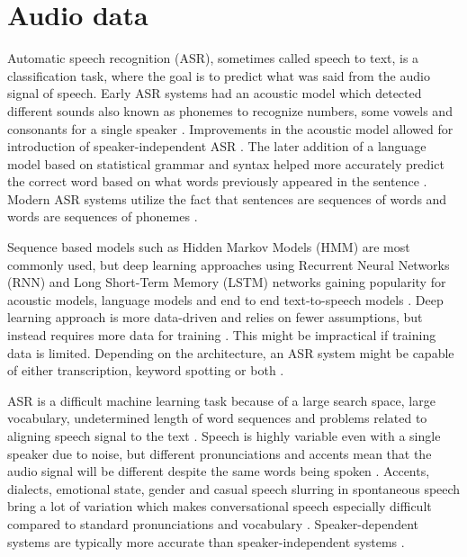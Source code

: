 \documentclass[utf8,english]{gradu3}
\begin{document}
\section{Audio data}
Automatic speech recognition (ASR), sometimes called speech to text, is a classification task, where the goal is to predict what was said from the audio signal of speech. Early ASR systems had an acoustic model which detected different sounds also known as phonemes to recognize numbers, some vowels and consonants for a single speaker \parencite{juangAutomaticSpeechRecognition2005}. Improvements in the acoustic model allowed for introduction of speaker-independent ASR \parencite{benzeghibaAutomaticSpeechRecognition2007,juangAutomaticSpeechRecognition2005}. The later addition of a language model based on statistical grammar and syntax helped more accurately predict the correct word based on what words previously appeared in the sentence \parencite{juangAutomaticSpeechRecognition2005}. Modern ASR systems utilize the fact that sentences are sequences of words and words are sequences of phonemes \parencite{bengioWordEmbeddingsSpeech2014}. 

Sequence based models such as Hidden Markov Models (HMM) are most commonly used, but deep learning approaches using Recurrent Neural Networks (RNN) and Long Short-Term Memory (LSTM) networks gaining popularity for acoustic models, language models and end to end text-to-speech models \parencite{bengioWordEmbeddingsSpeech2014,enarviAutomaticSpeechRecognition2017}. Deep learning approach is more data-driven and relies on fewer assumptions, but instead requires more data for training \parencite{bengioWordEmbeddingsSpeech2014}. This might be impractical if training data is limited. Depending on the architecture, an ASR system might be capable of either transcription, keyword spotting or both \parencite{juangAutomaticSpeechRecognition2005,enarviAutomaticSpeechRecognition2017}.

ASR is a difficult machine learning task because of a large search space, large vocabulary, undetermined length of word sequences and problems related to aligning speech signal to the text \parencite{enarviAutomaticSpeechRecognition2017}. Speech is highly variable even with a single speaker due to noise, but different pronunciations and accents mean that the audio signal will be different despite the same words being spoken \parencite{juangAutomaticSpeechRecognition2005}. Accents, dialects, emotional state, gender and casual speech slurring in spontaneous speech bring a lot of variation which makes conversational speech especially difficult compared to standard pronunciations and vocabulary \parencite{benzeghibaAutomaticSpeechRecognition2007, juangAutomaticSpeechRecognition2005}. Speaker-dependent systems are typically more accurate than speaker-independent systems \parencite{benzeghibaAutomaticSpeechRecognition2007,enarviAutomaticSpeechRecognition2017}.
\end{document}
